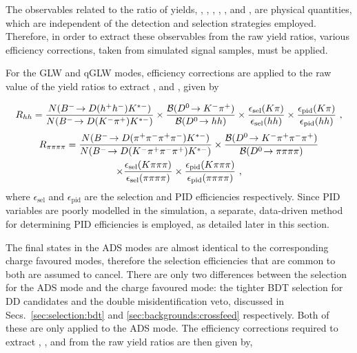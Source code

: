 The \CP observables related to the ratio of yields, \Rkk, \Rpipi, \Rptwo, \Rmtwo, \Rpipipipi, \Rpfour and \Rmfour, are physical quantities, which are independent of the detection and selection strategies employed. Therefore, in order to extract these \CP observables from the raw yield ratios, various efficiency corrections, taken from simulated signal samples, must be applied.

For the GLW and qGLW modes, efficiency corrections are applied to the raw value of the yield ratios to extract \Rkk, \Rpipi and \Rpipipipi, given by 

{\footnotesize
\begin{equation}
R_{hh} = \frac{N({{{B}^-}}\!\rightarrow {\ensuremath{D}}(h^+h^-){{K}^{*-}})}{N({{{B}^-}}\!\rightarrow {\ensuremath{D}}({{K}^-}{{\pi}^+}){{K}^{*-}})} \times \frac{{\mathcal{B}}({{D}^0}\!\rightarrow {\ensuremath{{K}^-}}{\ensuremath{{\pi}^+}})}{{\mathcal{B}}({{D}^0}\!\rightarrow hh)} \times \frac{\epsilon_{\text{sel}}(K\pi)}{\epsilon_{\text{sel}}(hh)} \times \frac{\epsilon_{\text{pid}}(K\pi)}{\epsilon_{\text{pid}}(hh)} \text{ ,}
\label{effcorrectionglw2body}
\end{equation}
\begin{multline}
R_{\pi\pi\pi\pi} = \frac{N({{{B}^-}}\!\rightarrow {\ensuremath{D}}({{\pi}^+}{{\pi}^-}{{\pi}^+}{{\pi}^-}){{K}^{*-}})}{N({{{B}^-}}\!\rightarrow {\ensuremath{D}}({{K}^-}{{\pi}^+}{{\pi}^-}{{\pi}^+}){{K}^{*-}})} \times \frac{{\mathcal{B}}({{D}^0}\!\rightarrow {\ensuremath{{K}^-}}{\ensuremath{{\pi}^+}}{\ensuremath{{\pi}^-}}{\ensuremath{{\pi}^+}})}{{\mathcal{B}}({{D}^0}\!\rightarrow \pi\pi\pi\pi)} \\ \times \frac{\epsilon_{\text{sel}}(K\pi\pi\pi)}{\epsilon_{\text{sel}}(\pi\pi\pi\pi)} \times \frac{\epsilon_{\text{pid}}(K\pi\pi\pi)}{\epsilon_{\text{pid}}(\pi\pi\pi\pi)} \text{ ,}
\label{effcorrectionglw4body}
\end{multline}}%
where $\epsilon_{\text{sel}}$ and $\epsilon_{\text{pid}}$ are the selection and PID efficiencies respectively. Since PID variables are poorly modelled in the \lhcb simulation, a separate, data-driven method for determining PID efficiencies is employed, as detailed later in this section.

The final states in the ADS modes are almost identical to the corresponding charge favoured modes, therefore the selection efficiencies that are common to both are assumed to cancel. There are only two differences between the selection for the ADS mode and the charge favoured mode: the tighter BDT selection for DD candidates and the double misidentification veto, discussed in Secs.~\ref{sec:selection:bdt} and \ref{sec:backgrounds:crossfeed} respectively. Both of these are only applied to the ADS mode. The efficiency corrections required to extract \Rptwo, \Rmtwo, \Rpfour and \Rmfour from the raw yield ratios are then given by, 

